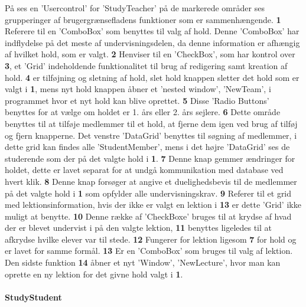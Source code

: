På  ses en 'Usercontrol' for 'StudyTeacher' på de markerede områder ses grupperinger af brugergrænsefladens funktioner som er sammenhængende.
\textbf{1} Referere til en 'ComboBox' som benyttes til valg af hold. 
Denne 'ComboBox' har indflydelse på det meste af undervisningsdelen, da denne information er afhængig af hvilket hold, som er valgt.
\textbf{2} Henviser til en 'CheckBox', som har kontrol over \textbf{3}, et 'Grid' indeholdende funktionalitet til brug af redigering samt kreation af hold.
\textbf{4} er tilføjning og sletning af hold, slet hold knappen sletter det hold som er valgt i \textbf{1}, mens nyt hold knappen åbner et 'nested window', 'NewTeam', i programmet hvor et nyt hold kan blive oprettet.
\textbf{5} Disse 'Radio Buttons' benyttes for at vælge om holdet er 1. års eller 2. års sejlere.
\textbf{6} Dette område benyttes til at tilføje medlemmer til et hold, at fjerne dem igen ved brug af tilføj og fjern knapperne. 
Det venstre 'DataGrid' benyttes til søgning af medlemmer, i dette grid kan findes alle 'StudentMember', mens i det højre 'DataGrid' ses de studerende som der på det valgte hold i \textbf{1}.
\textbf{7} Denne knap gemmer ændringer for holdet, dette er lavet separat for at undgå kommunikation med database ved hvert klik.
\textbf{8} Denne knap forsøger at angive et duelighedsbevis til de medlemmer på det valgte hold i \textbf{1} som opfylder alle undervisningskrav.
\textbf{9} Referer til et grid med lektionsinformation, hvis der ikke er valgt en lektion i \textbf{13} er dette 'Grid' ikke muligt at benytte.
\textbf{10} Denne række af 'CheckBoxe' bruges til at krydse af hvad der er blevet undervist i på den valgte lektion, \textbf{11} benyttes ligeledes til at afkrydse hvilke elever var til stede.
\textbf{12} Fungerer for lektion ligesom \textbf{7} for hold og er lavet for samme formål.
\textbf{13} Er en 'ComboBox' som bruges til valg af lektion.
Den sidste funktion \textbf{14} åbner et nyt 'Window', 'NewLecture', hvor man kan oprette en ny lektion for det givne hold valgt i \textbf{1}.

\paragraph{StudyStudent}

